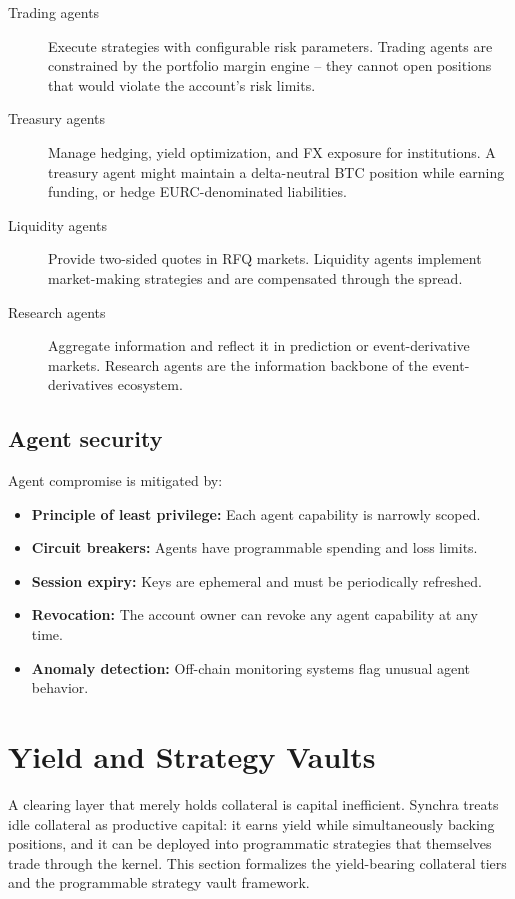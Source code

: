 \documentclass[11pt,a4paper]{article}
\begin{document}
\begin{description}
  \item[Trading agents] Execute strategies with configurable risk parameters. Trading agents are constrained by the portfolio margin engine -- they cannot open positions that would violate the account's risk limits.
  \item[Treasury agents] Manage hedging, yield optimization, and FX exposure for institutions. A treasury agent might maintain a delta-neutral BTC position while earning funding, or hedge EURC-denominated liabilities.
  \item[Liquidity agents] Provide two-sided quotes in RFQ markets. Liquidity agents implement market-making strategies and are compensated through the spread.
  \item[Research agents] Aggregate information and reflect it in prediction or event-derivative markets. Research agents are the information backbone of the event-derivatives ecosystem.
\end{description}

\subsection{Agent security}

Agent compromise is mitigated by:
\begin{itemize}
  \item \textbf{Principle of least privilege:} Each agent capability is narrowly scoped.
  \item \textbf{Circuit breakers:} Agents have programmable spending and loss limits.
  \item \textbf{Session expiry:} Keys are ephemeral and must be periodically refreshed.
  \item \textbf{Revocation:} The account owner can revoke any agent capability at any time.
  \item \textbf{Anomaly detection:} Off-chain monitoring systems flag unusual agent behavior.
\end{itemize}

\section{Yield and Strategy Vaults}
\label{sec:yield}

A clearing layer that merely holds collateral is capital inefficient. Synchra treats idle collateral as productive capital: it earns yield while simultaneously backing positions, and it can be deployed into programmatic strategies that themselves trade through the kernel. This section formalizes the yield-bearing collateral tiers and the programmable strategy vault framework.
\end{document}
